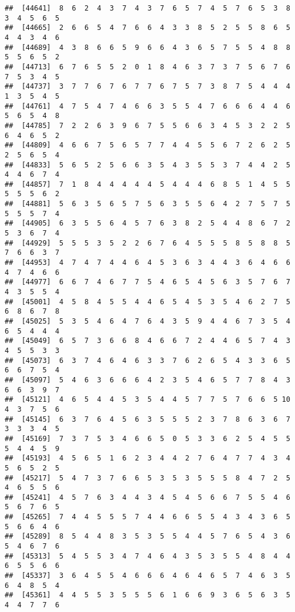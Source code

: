 \documentclass[
]{book}
\begin{document}
\begin{verbatim}
##  [44641]  8  6  2  4  3  7  4  3  7  6  5  7  4  5  7  6  5  3  8  3  4  5  6  5
##  [44665]  2  6  6  5  4  7  6  6  4  3  3  8  5  2  5  5  8  6  5  4  4  3  4  6
##  [44689]  4  3  8  6  6  5  9  6  6  4  3  6  5  7  5  5  4  8  8  5  5  6  5  2
##  [44713]  6  7  6  5  5  2  0  1  8  4  6  3  7  3  7  5  6  7  6  7  5  3  4  5
##  [44737]  3  7  7  6  7  6  7  7  6  7  5  7  3  8  7  5  4  4  4  1  3  5  4  5
##  [44761]  4  7  5  4  7  4  6  6  3  5  5  4  7  6  6  6  4  4  6  5  6  5  4  8
##  [44785]  7  2  2  6  3  9  6  7  5  5  6  6  3  4  5  3  2  2  5  6  4  6  5  2
##  [44809]  4  6  6  7  5  6  5  7  7  4  4  5  5  6  7  2  6  2  5  2  5  6  5  4
##  [44833]  5  6  5  2  5  6  6  3  5  4  3  5  5  3  7  4  4  2  5  4  4  6  7  4
##  [44857]  7  1  8  4  4  4  4  4  5  4  4  4  6  8  5  1  4  5  5  5  5  5  6  2
##  [44881]  5  6  3  5  6  5  7  5  6  3  5  5  6  4  2  7  5  7  5  5  5  5  7  4
##  [44905]  6  3  5  5  6  4  5  7  6  3  8  2  5  4  4  8  6  7  2  5  3  6  7  4
##  [44929]  5  5  5  3  5  2  2  6  7  6  4  5  5  5  8  5  8  8  5  7  6  6  3  7
##  [44953]  4  7  4  7  4  4  6  4  5  3  6  3  4  4  3  6  4  6  6  4  7  4  6  6
##  [44977]  6  6  7  4  6  7  7  5  4  6  5  4  5  6  3  5  7  6  7  4  3  5  5  4
##  [45001]  4  5  8  4  5  5  4  4  6  5  4  5  3  5  4  6  2  7  5  6  8  6  7  8
##  [45025]  5  3  5  4  6  4  7  6  4  3  5  9  4  4  6  7  3  5  4  6  5  4  4  4
##  [45049]  6  5  7  3  6  6  8  4  6  6  7  2  4  4  6  5  7  4  3  4  5  5  3  3
##  [45073]  6  3  7  4  6  4  6  3  3  7  6  2  6  5  4  3  3  6  5  6  6  7  5  4
##  [45097]  5  4  6  3  6  6  6  4  2  3  5  4  6  5  7  7  8  4  3  6  6  3  9  7
##  [45121]  4  6  5  4  4  5  3  5  4  4  5  7  7  5  7  6  6  5 10  4  3  7  5  6
##  [45145]  6  3  7  6  4  5  6  3  5  5  5  2  3  7  8  6  3  6  7  3  3  3  4  5
##  [45169]  7  3  7  5  3  4  6  6  5  0  5  3  3  6  2  5  4  5  5  5  4  4  5  9
##  [45193]  4  5  6  5  1  6  2  3  4  4  2  7  6  4  7  7  4  3  4  5  6  5  2  5
##  [45217]  5  4  7  3  7  6  6  5  3  5  3  5  5  5  8  4  7  2  5  4  6  5  5  6
##  [45241]  4  5  7  6  3  4  4  3  4  5  4  5  6  6  7  5  5  4  6  5  6  7  6  5
##  [45265]  7  4  4  5  5  5  7  4  4  6  6  5  5  4  3  4  3  6  5  5  6  6  4  6
##  [45289]  8  5  4  4  8  3  5  3  5  5  4  4  5  7  6  5  4  3  6  5  4  6  7  6
##  [45313]  5  4  5  5  3  4  7  4  6  4  3  5  3  5  5  4  8  4  4  6  5  5  6  6
##  [45337]  3  6  4  5  5  4  6  6  6  4  6  4  6  5  7  4  6  3  5  6  4  8  5  4
##  [45361]  4  4  5  5  3  5  5  5  6  1  6  6  9  3  6  5  6  3  5  4  4  7  7  6

\end{verbatim}
\end{document}
